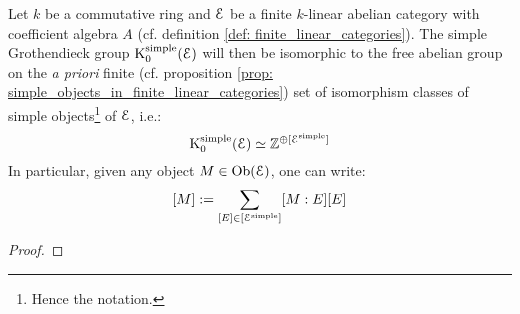             \begin{proposition} \label{prop: simple_grothendieck_groups_of_finite_linear_abelian_categories_are_free_on_simple_objects} 
                Let $k$ be a commutative ring and $\mathcal{E}$ be a finite $k$-linear abelian category with coefficient algebra $A$ (cf. definition \ref{def: finite_linear_categories}). The simple Grothendieck group $\mathrm{K}_0^{\mathrm{simple}}(\mathcal{E})$ will then be isomorphic to the free abelian group on the \textit{a priori} finite (cf. proposition \ref{prop: simple_objects_in_finite_linear_categories}) set of isomorphism classes of simple objects\footnote{Hence the notation.} of $\mathcal{E}$, i.e.:
                    $$\mathrm{K}_0^{\mathrm{simple}}(\mathcal{E}) \simeq \mathbb{Z}^{\oplus [\mathcal{E}^{\mathrm{simple}}]}$$
                In particular, given any object $M \in \mathrm{Ob}(\mathcal{E})$, one can write:
                    $$[M] := \sum_{[E] \in [\mathcal{E}^{\mathrm{simple}}]} [M : E] [E]$$
            \end{proposition}
                \begin{proof}
                    
                \end{proof}
                
